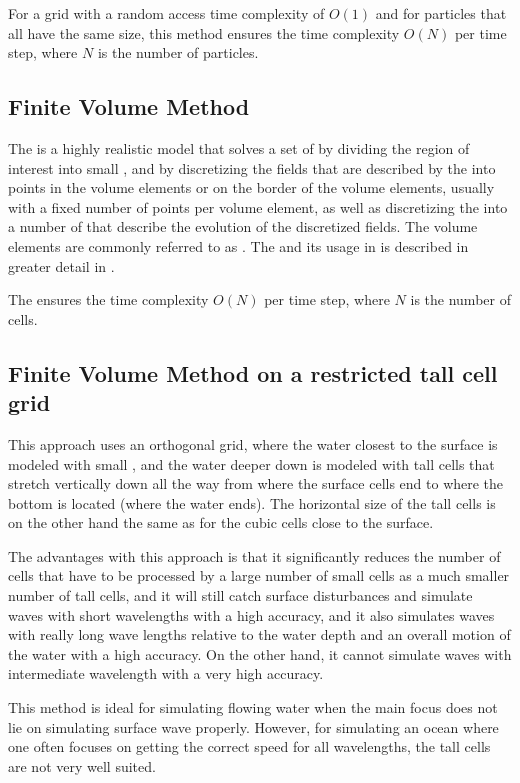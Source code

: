 For a grid with a random access time complexity of $O(1)$ and for particles that all have the same size, this method ensures the time complexity $O(N)$ per time step, where $N$ is the number of particles.

\subsection{Finite Volume Method}

The \FVM is a highly realistic model that solves a set of \PDEs by dividing the region of interest into small , and by discretizing the fields that are described by the \PDEs into points in the volume elements or on the border of the volume elements, usually with a fixed number of points per volume element, as well as discretizing the \PDEs into a number of \ODEs that describe the evolution of the discretized fields. The volume elements are commonly referred to as \cells. The \FVM and its usage in \CFD is described in greater detail in .

The \FVM ensures the time complexity $O(N)$ per time step, where $N$ is the number of cells.

\subsection{Finite Volume Method on a restricted tall cell grid}

This approach \citep{Chentanez2011} uses an orthogonal grid, where the water closest to the surface is modeled with small , and the water deeper down is modeled with tall cells that stretch vertically down all the way from where the surface cells end to where the bottom is located (where the water ends). The horizontal size of the tall cells is on the other hand the same as for the cubic cells close to the surface.

The advantages with this approach is that it significantly reduces the number of cells that have to be processed by \approximating a large number of small cells as a much smaller number of tall cells, and it will still catch surface disturbances and simulate waves with short wavelengths with a high accuracy, and it also simulates waves with really long wave lengths relative to the water depth and an overall motion of the water with a high accuracy. On the other hand, it cannot simulate waves with intermediate wavelength with a very high accuracy.

This method is ideal for simulating flowing water when the main focus does not lie on simulating surface wave properly. However, for simulating an ocean where one often focuses on getting the correct speed for all wavelengths, the tall cells are not very well suited.

